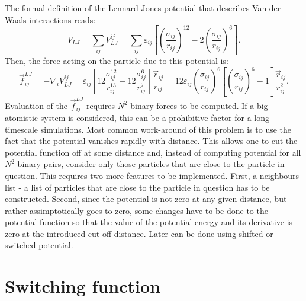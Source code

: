 \documentclass[11pt]{book}
\begin{document}
The formal definition of the Lennard-Jones potential that describes Van-der-Waals interactions reads:
\begin{equation}\label{eq:pot-lj}
V_{LJ}=\sum_{ij}V_{LJ}^{ij}=\sum_{ij}\varepsilon_{ij}\left[\left(\frac{\sigma_{ij}}{r_{ij}}\right)^{12}-2\left(\frac{\sigma_{ij}}{r_{ij}}\right)^{6}\right].
\end{equation}
Then, the force acting on the particle due to this potential is:
\begin{equation}\label{eq:f-lj}
\vec{f}^{LJ}_{ij}=-\nabla_{i}V_{LJ}^{ij}=\varepsilon_{ij}\left[12\frac{\sigma_{ij}^{12}}{r_{ij}^{13}}-12\frac{\sigma_{ij}^{6}}{r_{ij}^{7}}\right]\frac{\vec{r}_{ij}}{r_{ij}}=12\varepsilon_{ij}\left(\frac{\sigma_{ij}}{r_{ij}}\right)^{6}\left[\left(\frac{\sigma_{ij}}{r_{ij}}\right)^{6}-1\right]\frac{\vec{r}_{ij}}{r_{ij}^{2}}.
\end{equation}
Evaluation of the $\vec{f}^{LJ}_{ij}$ requires $N^{2}$ binary forces to be computed. If a big atomistic system is considered, this can be a prohibitive factor for a long-timescale simulations. Most common work-around of this problem is to use the fact that the potential vanishes rapidly with distance. This allows one to cut the potential function off at some distance and, instead of computing potential for all $N^{2}$ binary pairs, consider only those particles that are close to the particle in question. This requires two more features to be implemented. First, a neighbours list - a list of particles that are close to the particle in question has to be constructed. Second, since the potential is not zero at any given distance, but rather assimptotically goes to zero, some changes have to be done to the potential function so that the value of the potential energy and its derivative is zero at the introduced cut-off distance. Later can be done using shifted or switched potential.


\section{Switching function}
\end{document}
